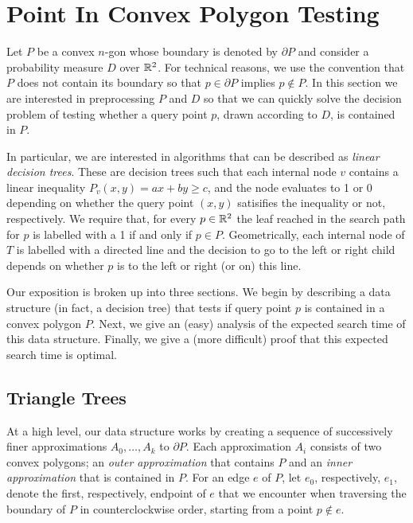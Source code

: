 \documentclass[charterfonts,lotsofwhite]{patmorin}
\newcommand{\boundary}{\partial}
\begin{document}
\section{Point In Convex Polygon Testing}

Let $P$ be a convex $n$-gon whose boundary is denoted by $\partial P$
and consider a probability measure $D$ over $\mathbb{R}^2$.  For technical
reasons, we use the convention that $P$ does not contain its boundary
so that $p\in \boundary P$ implies $p\not\in P$.  In this section we
are interested in preprocessing $P$ and $D$ so that we can quickly
solve the decision problem of testing whether a query point $p$, drawn
according to $D$, is contained in $P$. 

In particular, we are interested in algorithms that can be described
as \emph{linear decision trees}.  These are decision trees such that
each internal node $v$ contains a linear inequality $P_v(x,y)=ax+by
\ge c$, and the node evaluates to 1 or 0 depending on whether the
query point $(x,y)$ satisifies the inequality or not, respectively.
We require that, for every $p\in\mathbb{R}^2$ the leaf reached in the search
path for $p$ is labelled with a 1 if and only if $p\in P$.
Geometrically, each internal node of $T$ is labelled with a directed
line and the decision to go to the left or right child depends on
whether $p$ is to the left or right (or on) this line.  

Our exposition is broken up into three sections.  We begin by
describing a data structure (in fact, a decision tree) that tests if
query point $p$ is contained in a convex polygon  $P$.  Next, we give
an (easy) analysis of the expected search time of this data structure.
Finally, we give a (more difficult) proof that this expected search
time is optimal.


\subsection{Triangle Trees}

At a high level, our data structure works by creating a sequence of
successively finer approximations $A_0,\ldots,A_k$ to $\boundary P$.
Each approximation $A_i$ consists of two convex polygons; an
\emph{outer approximation} that contains $P$ and an \emph{inner
approximation} that is contained in $P$.  For an edge $e$ of $P$, let
$e_0$, respectively, $e_1$, denote the first, respectively, endpoint
of $e$ that we encounter when traversing the boundary of $P$ in
counterclockwise order, starting from a point $p\not\in e$.
\end{document}
